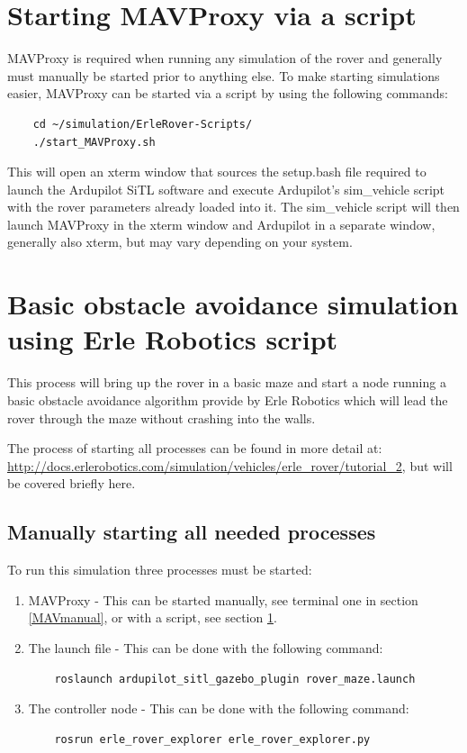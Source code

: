 \documentclass{report}
\begin{document}
\section{Starting MAVProxy via a script}\label{MAVscript}
MAVProxy is required when running any simulation of the rover and generally must manually be started prior to anything else. To make starting simulations easier, MAVProxy can be started via a script by using the following commands:
\begin{lstlisting}
	cd ~/simulation/ErleRover-Scripts/
	./start_MAVProxy.sh 
\end{lstlisting}

This will open an xterm window that sources the setup.bash file required to launch the Ardupilot SiTL software and execute Ardupilot's sim\_vehicle script with the rover parameters already loaded into it. The sim\_vehicle script will then launch MAVProxy in the xterm window and Ardupilot in a separate window, generally also xterm, but may vary depending on your system.



\section{Basic obstacle avoidance simulation using Erle Robotics script}
This process will bring up the rover in a basic maze and start a node running a basic obstacle avoidance algorithm provide by Erle Robotics which will lead the rover through the maze without crashing into the walls.

The process of starting all processes can be found in more detail at: \\ \href{http://docs.erlerobotics.com/simulation/vehicles/erle_rover/tutorial_2}{http://docs.erlerobotics.com/simulation/vehicles/erle\_rover/tutorial\_2}, but will be covered briefly here.

\subsection{Manually starting all needed processes}
To run this simulation three processes must be started:

\begin{enumerate}
	\item MAVProxy - This can be started manually, see terminal one in section \ref{MAVmanual}, or with a script, see section \ref{MAVscript}.
	\item The launch file - This can be done with the following command:
	\begin{lstlisting}
	roslaunch ardupilot_sitl_gazebo_plugin rover_maze.launch
	\end{lstlisting}
	\item The controller node - This can be done with the following command:
	\begin{lstlisting}
	rosrun erle_rover_explorer erle_rover_explorer.py
	\end{lstlisting}
\end{enumerate}
\end{document}
